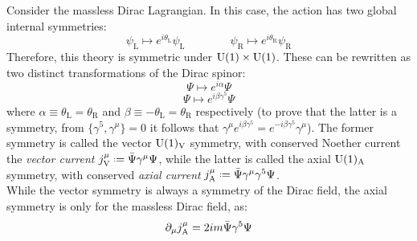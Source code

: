Consider the massless Dirac Lagrangian. In this case, the action has two global internal symmetries:
\begin{equation*}
  \psi_\text{L} \mapsto e^{i \theta_\text{L}} \psi_\text{L}
  \qquad \qquad
  \psi_\text{R} \mapsto e^{i \theta_\text{R}} \psi_\text{R}
\end{equation*}
Therefore, this theory is symmetric under $ \mathrm{U}(1) \times \mathrm{U}(1) $. These can be rewritten as two distinct transformations of the Dirac spinor:
\begin{equation}
  \Psi \mapsto e^{i \alpha} \Psi
  \label{eq:1.102}
\end{equation}
\begin{equation}
  \Psi \mapsto e^{i \beta \gamma^5} \Psi
  \label{eq:1.103}
\end{equation}
where $ \alpha \equiv \theta_\text{L} = \theta_\text{R} $ and $ \beta \equiv - \theta_\text{L} = \theta_\text{R} $ respectively (to prove that the latter is a symmetry, from $ \{\gamma^5, \gamma^\mu\} = 0 $ it follows that $ \gamma^\mu e^{i \beta \gamma^5} = e^{-i \beta \gamma^5} \gamma^\mu $). The former symmetry is called the vector $ \mathrm{U}(1)_\text{V} $ symmetry, with conserved Noether current the \textit{vector current} $ j^\mu_\text{V} \defeq \bar{\Psi} \gamma^\mu \Psi $, while the latter is called the axial $ \mathrm{U}(1)_\text{A} $ symmetry, with conserved \textit{axial current} $ j^\mu_\text{A} \defeq \bar{\Psi} \gamma^\mu \gamma^5 \Psi $.\\
While the vector symmetry is always a symmetry of the Dirac field, the axial symmetry is only for the massless Dirac field, as:
\begin{equation}
  \partial_\mu j^\mu_\text{A} = 2 i m \bar{\Psi} \gamma^5 \Psi
  \label{eq:1.104}
\end{equation}










